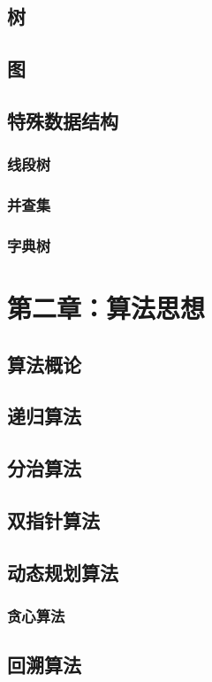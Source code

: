 \documentclass[UTF8]{article}
\begin{document}
        \subsection{树}
        \subsection{图}
        \subsection{特殊数据结构}
            \subsubsection{线段树}
            \subsubsection{并查集}
            \subsubsection{字典树}
    \newpage
    \section{第二章：算法思想}
        \subsection{算法概论}
        \subsection{递归算法}
        \subsection{分治算法}
        \subsection{双指针算法}
        \subsection{动态规划算法}
            \subsubsection{贪心算法}
        \subsection{回溯算法}
\end{document}
